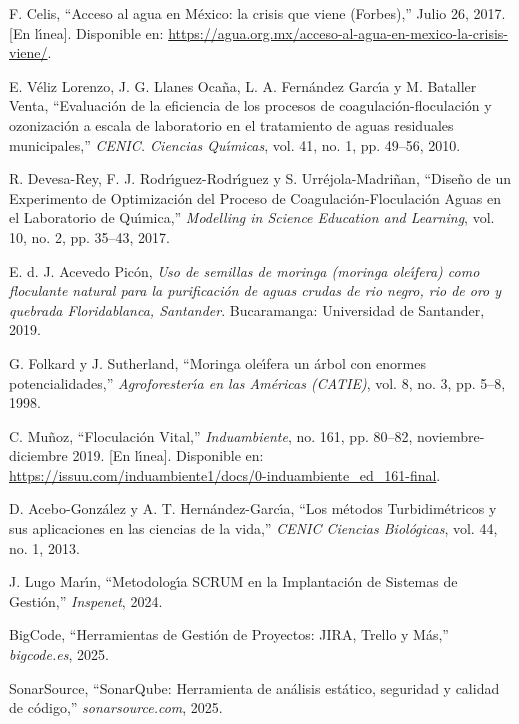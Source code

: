 \documentclass[conference]{IEEEtran}
\begin{document}
	\begin{thebibliography}{00}
		 F. Celis, ``Acceso al agua en M\'exico: la crisis que viene (Forbes),'' Julio 26, 2017. [En l\'{\i}nea]. Disponible en: \url{https://agua.org.mx/acceso-al-agua-en-mexico-la-crisis-viene/}.
		
		 E. V\'eliz Lorenzo, J. G. Llanes Oca\~na, L. A. Fern\'andez Garc\'{\i}a y M. Bataller Venta, ``Evaluaci\'on de la eficiencia de los procesos de coagulaci\'on-floculaci\'on y ozonizaci\'on a escala de laboratorio en el tratamiento de aguas residuales municipales,'' \textit{CENIC. Ciencias Qu\'{\i}micas}, vol. 41, no. 1, pp. 49--56, 2010.
		
		 R. Devesa-Rey, F. J. Rodr\'{\i}guez-Rodr\'{\i}guez y S. Urr\'ejola-Madri\~nan, ``Dise\~no de un Experimento de Optimizaci\'on del Proceso de Coagulaci\'on-Floculaci\'on Aguas en el Laboratorio de Qu\'{\i}mica,'' \textit{Modelling in Science Education and Learning}, vol. 10, no. 2, pp. 35--43, 2017.
		
		 E. d. J. Acevedo Pic\'on, \textit{Uso de semillas de moringa (moringa ole\'{\i}fera) como floculante natural para la purificaci\'on de aguas crudas de rio negro, rio de oro y quebrada Floridablanca, Santander}. Bucaramanga: Universidad de Santander, 2019.
		
		 G. Folkard y J. Sutherland, ``Moringa ole\'{\i}fera un \'arbol con enormes potencialidades,'' \textit{Agroforester\'{\i}a en las Am\'ericas (CATIE)}, vol. 8, no. 3, pp. 5--8, 1998.
		
		 C. Mu\~noz, ``Floculaci\'on Vital,'' \textit{Induambiente}, no. 161, pp. 80--82, noviembre-diciembre 2019. [En l\'{\i}nea]. Disponible en: \url{https://issuu.com/induambiente1/docs/0-induambiente_ed_161-final}.
		
		 D. Acebo-Gonz\'alez y A. T. Hern\'andez-Garc\'{\i}a, ``Los m\'etodos Turbidim\'etricos y sus aplicaciones en las ciencias de la vida,'' \textit{CENIC Ciencias Biol\'ogicas}, vol. 44, no. 1, 2013.
		
		  J. Lugo Mar\'{\i}n, ``Metodolog\'{\i}a SCRUM en la Implantaci\'on de Sistemas de Gesti\'on,'' \textit{Inspenet}, 2024.
		
		 BigCode, ``Herramientas de Gesti\'on de Proyectos: JIRA, Trello y M\'as,'' \textit{bigcode.es}, 2025.
		
		 SonarSource, ``SonarQube: Herramienta de an\'alisis est\'atico, seguridad y calidad de c\'odigo,'' \textit{sonarsource.com}, 2025.
		

\end{thebibliography}
\end{document}

